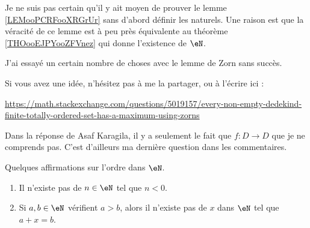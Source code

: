 \begin{probleme}		\label{PROBooUCQFooTugfDl}
	Je ne suis pas certain qu'il y ait moyen de prouver le lemme \ref{LEMooPCRFooXRGrUr} sans d'abord définir les naturels. Une raison est que la véracité de ce lemme est à peu près équivalente au théorème \ref{THOooEJPYooZFVnez} qui donne l'existence de \( \eN\).

	J'ai essayé un certain nombre de choses avec le lemme de Zorn sans succès.

	Si vous avez une idée, n'hésitez pas à me la partager, ou à l'écrire ici :
	\begin{center}
		\url{https://math.stackexchange.com/questions/5019157/every-non-empty-dedekind-finite-totally-ordered-set-has-a-maximum-using-zorns}
	\end{center}

	Dans la réponse de Asaf Karagila, il y a seulement le fait que \(f \colon D\to D  \) que je ne comprends pas. C'est d'ailleurs ma dernière question dans les commentaires.
\end{probleme}




\begin{lemma}       \label{LEMooYMRJooYIAhBb}
	Quelques affirmations sur l'ordre dans \( \eN\).
	\begin{enumerate}
		\item       \label{ITEMooTLOIooTWNtod}
		      Il n'existe pas de \( n\in \eN\) tel que \( n<0\).
		\item       \label{ITEMooPJKQooGfLCUM}
		      Si \( a,b\in \eN\) vérifient \( a>b\), alors il n'existe pas de \( x\) dans \( \eN\) tel que \( a+x=b\).
	\end{enumerate}
\end{lemma}

